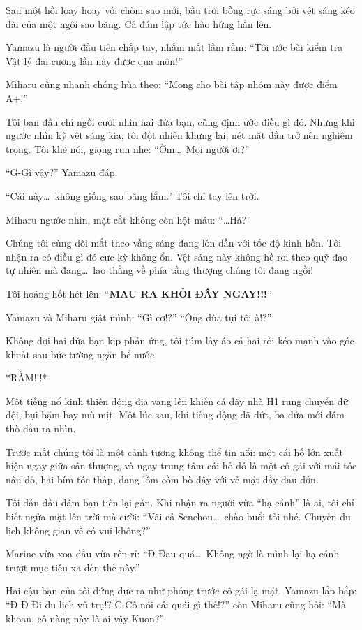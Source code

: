 \documentclass[../main.tex]{subfiles}
\begin{document}
\ct

Sau một hồi loay hoay với chòm sao mới, bầu trời bỗng rực sáng bởi vệt sáng kéo dài của một ngôi sao băng. Cả đám lập tức hào hứng hẳn lên.

Yamazu là người đầu tiên chắp tay, nhắm mắt lầm rầm: ``Tôi ước bài kiểm tra Vật lý đại cương lần này được qua môn!''

Miharu cũng nhanh chóng hùa theo: ``Mong cho bài tập nhóm này được điểm A+!''

Tôi ban đầu chỉ ngồi cười nhìn hai đứa bạn, cũng định ước điều gì đó. Nhưng khi ngước nhìn kỹ vệt sáng kia, tôi đột nhiên khựng lại, nét mặt dần trở nên nghiêm trọng. Tôi khẽ nói, giọng run nhẹ: ``Ờm\dots\ Mọi người ơi?''

``G-Gì vậy?'' Yamazu đáp.

``Cái này\dots\ không giống sao băng lắm.'' Tôi chỉ tay lên trời.

Miharu ngước nhìn, mặt cắt không còn hột máu: ``\dots Hả?''

Chúng tôi cùng dõi mắt theo vầng sáng đang lớn dần với tốc độ kinh hồn. Tôi nhận ra có điều gì đó cực kỳ không ổn. Vệt sáng này không hề rơi theo quỹ đạo tự nhiên mà đang\dots\ lao thẳng về phía tầng thượng chúng tôi đang ngồi!

Tôi hoảng hốt hét lên: ``\textbf{MAU RA KHỎI ĐÂY NGAY!!!}''

Yamazu và Miharu giật mình: ``Gì cơ!?'' ``Ông đùa tụi tôi à!?''

Không đợi hai đứa bạn kịp phản ứng, tôi túm lấy áo cả hai rồi kéo mạnh vào góc khuất sau bức tường ngăn bể nước.

*RẦM!!!*

Một tiếng nổ kinh thiên động địa vang lên khiến cả dãy nhà H1 rung chuyển dữ dội, bụi bặm bay mù mịt. Một lúc sau, khi tiếng động đã dứt, ba đứa mới dám thò đầu ra nhìn.

Trước mắt chúng tôi là một cảnh tượng không thể tin nổi: một cái hố lớn xuất hiện ngay giữa sân thượng, và ngay trung tâm cái hố đó là một cô gái với mái tóc nâu đỏ, hai bím tóc thấp, đang lồm cồm bò dậy với vẻ mặt đầy đau đớn.

Tôi dẫn đầu đám bạn tiến lại gần. Khi nhận ra người vừa ``hạ cánh'' là ai, tôi chỉ biết ngửa mặt lên trời mà cười: ``Vãi cả Senchou\dots\ chào buổi tối nhé. Chuyến du lịch không gian về có vui không?''

Marine vừa xoa đầu vừa rên rỉ: ``Đ-Đau quá\dots\ Không ngờ là mình lại hạ cánh trượt mục tiêu xa đến thế này.''

Hai cậu bạn của tôi đứng đực ra như phỗng trước cô gái lạ mặt. Yamazu lắp bắp: ``Đ-Đ-Đi du lịch vũ trụ!? C-Cô nói cái quái gì thế!?'' còn Miharu cũng hỏi: ``Mà khoan, cô nàng này là ai vậy Kuon?''
\end{document}
